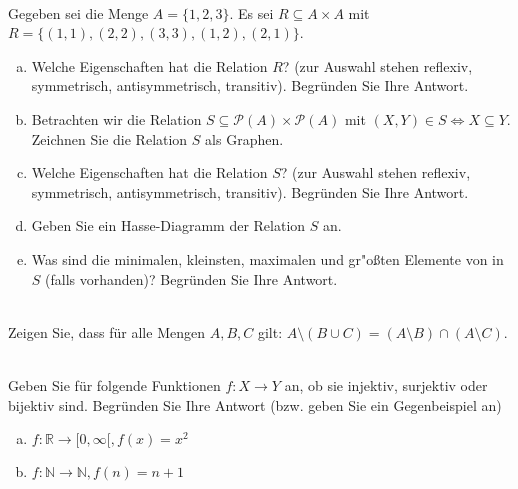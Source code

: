 \\
Gegeben sei die Menge $A=\{1,2,3\}$. Es sei $R\subseteq A\times A$ mit $R=\{(1,1),(2,2),(3,3),(1,2),(2,1)\}$.
\begin{enumerate}[a)]
    \item Welche Eigenschaften hat die Relation $R$? (zur Auswahl stehen reflexiv, symmetrisch, antisymmetrisch, transitiv). Begründen Sie Ihre Antwort.
    \item Betrachten wir die Relation $S\subseteq \mathscr{P}(A)\times \mathscr{P}(A)$ mit $(X,Y)\in S\Leftrightarrow X\subseteq Y$. Zeichnen Sie die Relation $S$ als Graphen.
    \item Welche Eigenschaften hat die Relation $S$? (zur Auswahl stehen reflexiv, symmetrisch, antisymmetrisch, transitiv). Begründen Sie Ihre Antwort.
    \item Geben Sie ein Hasse-Diagramm der Relation $S$ an.
    \item Was sind die minimalen, kleinsten, maximalen und gr"o{\ss}ten Elemente von in $S$ (falls vorhanden)? Begründen Sie Ihre Antwort.

\end{enumerate}

\\
Zeigen Sie, dass für alle Mengen $A,B,C$ gilt: $A\setminus (B\cup C) = (A\setminus B)\cap (A\setminus C)$.

\\
Geben Sie für folgende Funktionen $f:X\to Y$ an, ob sie injektiv, surjektiv oder bijektiv sind. Begründen Sie Ihre Antwort (bzw. geben Sie ein Gegenbeispiel an)
\begin{enumerate}[a)]
    
    \item $f:\mathbb{R}\to [0,\infty[, f(x)=x^2$
    \item $f:\mathbb{N}\to\mathbb{N}, f(n)=n+1$ 
\end{enumerate}

\hspace{5cm}

